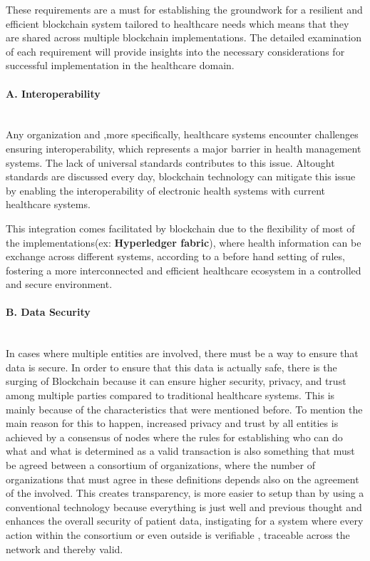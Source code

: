 These requirements are a must for establishing the groundwork for a resilient and efficient blockchain system tailored to healthcare needs which means that they are shared across multiple blockchain implementations. The detailed examination of each requirement will provide insights into the necessary considerations for successful implementation in the healthcare domain.

\paragraph{A. Interoperability} \mbox{}\\
Any organization and ,more specifically, healthcare systems encounter challenges ensuring interoperability, which represents a major barrier in health management systems. The lack of universal standards contributes to this issue. Altought standards are discussed every day,   blockchain technology can mitigate this issue by enabling the interoperability of electronic health systems with current healthcare systems.

This integration comes facilitated by blockchain due to the flexibility of most of the implementations(ex: \textbf{Hyperledger fabric}), where health information can be exchange across different systems, according to a before hand setting of rules, fostering a more interconnected and efficient healthcare ecosystem in a controlled and secure environment.
\paragraph{B. Data Security} \mbox{}\\
In cases where multiple entities are involved, there must be a way to ensure that data is secure. In order to ensure that this data is actually safe, there is the surging of Blockchain because it can ensure higher security, privacy, and trust among multiple parties compared to traditional healthcare systems. This is mainly because of the characteristics that were mentioned before. To mention the main reason for this to happen, increased privacy and trust by all entities is achieved by a consensus of nodes where the rules for establishing who can do what and what is determined as a valid transaction is also something that must be agreed between a consortium of organizations, where the number of organizations that must agree in these definitions depends also on the agreement of the involved. This creates transparency, is more easier to setup than by using a conventional technology because everything is just well and previous thought and enhances the overall security of patient data, instigating for a system where every action within the consortium or even outside is verifiable , traceable across the network and thereby valid.
